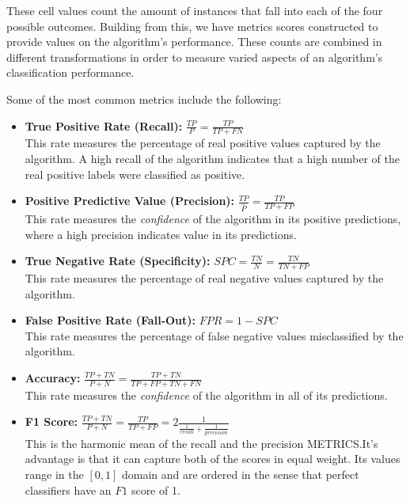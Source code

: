 These cell values count the amount of instances that fall into each of the four possible outcomes.
Building from this, we have metrics scores constructed to provide values on the algorithm's performance. 
These counts are combined in different transformations in order to measure varied aspects of an algorithm's classification performance.

Some of the most common metrics include the following:

\begin{itemize}
\item \textbf{True Positive Rate (Recall):} $\frac{TP}{P} = \frac{TP}{TP + FN}$ \\ This rate measures the percentage of real positive values captured by the algorithm.
A high recall of the algorithm indicates that a high number of the real positive labels were classified as positive.


\item \textbf{Positive Predictive Value (Precision):} $\frac{TP}{\hat{P}} = \frac{TP}{TP + FP}$ \\ This rate measures the \textit{confidence} of the algorithm in its positive predictions, where a high precision indicates value in its predictions.

\item \textbf{True Negative Rate (Specificity):} $ SPC = \frac{TN}{N} = \frac{TN}{TN + FP}$ \\ This rate measures the percentage of real negative values captured by the algorithm.


\item \textbf{False Positive Rate (Fall-Out):} $FPR = 1 - SPC$ \\ This rate measures the percentage of false negative values misclassified by the algorithm.

\item \textbf{Accuracy:} $\frac{TP + TN}{P + N} = \frac{TP + TN}{TP + FP + TN + FN}$ \\ This rate measures the \textit{confidence} of the algorithm in all of its predictions.


\item \textbf{F1 Score:} $\frac{TP + TN}{P + N} = \frac{TP}{TP + FP} = 2 \frac{1}{ \frac{1}{recall} + \frac{1}{precision} }$ \\ This is the harmonic mean of the recall and the precision METRICS.\@ It's advantage is that it can capture both of the scores in equal weight.
Its values range in the ${[0,1 ]}$ domain and are ordered in the sense that perfect classifiers have an $F1$ score of 1.

\end{itemize}



